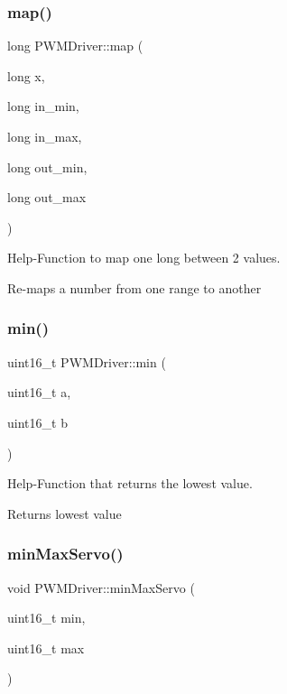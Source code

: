 \subsubsection{\texorpdfstring{map()}{map()}}
{\footnotesize\ttfamily long P\+W\+M\+Driver\+::map (\begin{DoxyParamCaption}\item[{long}]{x,  }\item[{long}]{in\+\_\+min,  }\item[{long}]{in\+\_\+max,  }\item[{long}]{out\+\_\+min,  }\item[{long}]{out\+\_\+max }\end{DoxyParamCaption})}



Help-\/\+Function to map one long between 2 values. 

Re-\/maps a number from one range to another \mbox{\label{classPWMDriver_aae39ea3ebac1a2b9724b7319b203230e}} 
\subsubsection{\texorpdfstring{min()}{min()}}
{\footnotesize\ttfamily uint16\+\_\+t P\+W\+M\+Driver\+::min (\begin{DoxyParamCaption}\item[{uint16\+\_\+t}]{a,  }\item[{uint16\+\_\+t}]{b }\end{DoxyParamCaption})}



Help-\/\+Function that returns the lowest value. 

Returns lowest value \mbox{\label{classPWMDriver_ae594f58413fa3e879f3038b8aa5c6027}} 
\subsubsection{\texorpdfstring{min\+Max\+Servo()}{minMaxServo()}}
{\footnotesize\ttfamily void P\+W\+M\+Driver\+::min\+Max\+Servo (\begin{DoxyParamCaption}\item[{uint16\+\_\+t}]{min,  }\item[{uint16\+\_\+t}]{max }\end{DoxyParamCaption})}



